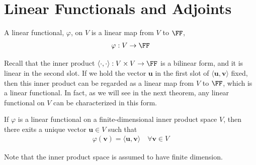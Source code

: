 \documentclass[thmcnt=section, color=blue, 12pt]{my-elegantbook}
\begin{document}
\begin{example} \label{eg:3}
\end{example}


\section{Linear Functionals and Adjoints}


\begin{definition} \label{def:3}
	A linear functional, $\varphi$, on $V$ is a linear map 
	from $V$ to $\FF$,
	\begin{align*}
		\varphi: V \to \FF
	\end{align*}
\end{definition}

Recall that
the inner product $\langle \cdot, \cdot \rangle: V \times V \to \FF$
is a bilinear form, and it is linear in the second slot.
If we hold the vector $\mathbf{u}$ in the first slot 
of $\langle \mathbf{u}, \mathbf{v} \rangle$ fixed,
then this inner product can be regarded as a linear map from $V$ to $\FF$,
which is a linear functional. 
In fact, as we will see in the next theorem, 
any linear functional on $V$ can be characterized in this form.


\begin{theorem} \label{thm:14}
	If $\varphi$ is a linear functional on 
	a finite-dimensional inner product space $V$, 
	then there exits a unique vector $\mathbf{u} \in V$
	such that
	\begin{align*}
		\varphi(\mathbf{v})
		= \langle \mathbf{u}, \mathbf{v} \rangle
		\quad \forall \mathbf{v} \in V
	\end{align*}
\end{theorem}

\begin{note}
	Note that the inner product space is assumed to have finite dimension.
\end{note}
\end{document}
